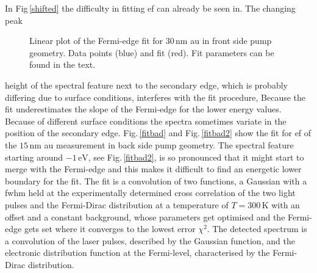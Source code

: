 \documentclass[a4paper,12pt,twoside]{article}
\begin{document}
\noindent
In Fig\,\ref{shifted} the difficulty in fitting \gls{ef} can already be seen in. The changing peak\begin{figure}
		\caption{Linear plot of the Fermi-edge fit for $30\,\mathrm{\mbox{nm}}$ \gls{au} in front side pump geometry. Data points (blue) and fit (red). Fit parameters can be found in the text.}
    		\label{fitgood}
	\end{figure} height of the spectral feature next to the secondary edge, which is probably differing due to surface conditions, interferes with the fit procedure, Because the fit underestimates the slope of the Fermi-edge for the lower energy values. Because of different surface conditions the spectra sometimes variate in the position of the secondary edge. Fig.\,\ref{fitbad} and Fig.\,\ref{fitbad2} show the fit for \gls{ef} of the $15\,\mathrm{\mbox{nm}}$ \gls{au} measurement in back side pump geometry. The spectral feature starting around $-1\,\mathrm{\mbox{eV}}$, see Fig.\,\ref{fitbad2}, is so pronounced that it might start to merge with the Fermi-edge and this makes it difficult to find an energetic lower boundary for the fit. The fit is a convolution of two functions, a Gaussian with a \gls{fwhm} held at the experimentally determined cross correlation of the two light pulses and the Fermi-Dirac distribution at a temperature of $T = 300\,\mathrm{\mbox{K}}$ with an offset and a constant background, whose parameters get optimised and the Fermi-edge gets set where it converges to the lowest error $\chi^{ 2 }$. The detected spectrum is a convolution of the laser pulses, described by the Gaussian function, and the electronic distribution function at the Fermi-level, characterised by the Fermi-Dirac distribution.
	
\end{document}
